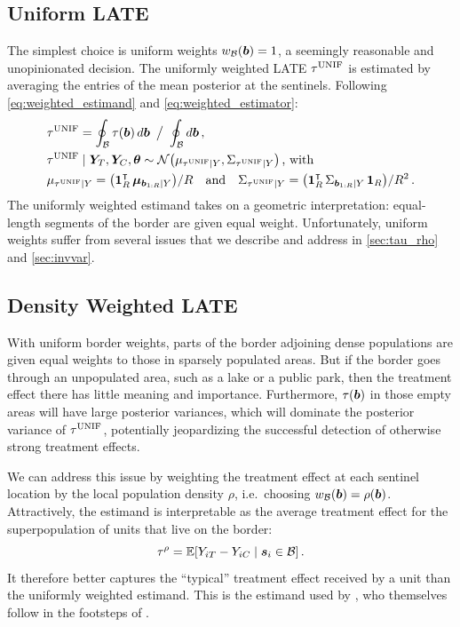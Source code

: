 \subsection{Uniform LATE}
The simplest choice is uniform weights \(w_{\mathcal{B}}(\bm{b})=1\), a seemingly reasonable and unopinionated decision.
The uniformly weighted LATE \(\tau^{\mathrm{UNIF}}\) is estimated by averaging the entries of the mean posterior at the sentinels.
Following \autoref{eq:weighted_estimand} and \autoref{eq:weighted_estimator}:
\begin{equation}\begin{split}
    &\unifavg = \oint_\border \tau(\sentinel) \dif\sentinel
        \ \big/ \ 
        \oint_\border \dif{\sentinel}  \,, \\
    &\unifavg \mid \yt, \yc, \hyperparam \sim \normal\del{\mu_{\unifavg \mid Y}, \Sigma_{\unifavg \mid Y}}\,\text{, with} \\
    &\mu_{\unifavg \mid Y} = \del{\ones_{\numsent}\trans \muvec_{\sentinels \mid Y}} / \numsent \quad\text{and}\quad
    \Sigma_{\unifavg \mid Y} = \del{\ones_{\numsent}\trans \Sigma_{\sentinels \mid Y} \ones_{\numsent}} / \numsent^2 \,.
\end{split}
\label{eq:unifavg}
\end{equation}
The uniformly weighted estimand takes on a geometric interpretation: equal-length segments of the border are given equal weight.
Unfortunately, uniform weights suffer from several issues that we describe and address in \autoref{sec:tau_rho} and \autoref{sec:invvar}.

\subsection{Density Weighted LATE}
\label{sec:tau_rho}

With uniform border weights, parts of the border adjoining dense populations are given equal weights to those in sparsely populated areas.
But if the border goes through an unpopulated area, such as a lake or a public park, then the treatment effect there has little meaning and importance.
Furthermore, \(\tau(\bm{b})\) in those empty areas will have large posterior variances, which will dominate the posterior variance of \(\tau^{\mathrm{UNIF}}\), potentially jeopardizing the successful detection of otherwise strong treatment effects.

We can address this issue by weighting the treatment effect at each sentinel location by the local population density \(\rho\),
i.e.\ choosing \(w_{\mathcal{B}}(\bm{b}) = \rho(\bm{b})\).
Attractively, the estimand is interpretable as the average treatment effect for the superpopulation of units that live on the border:
\begin{equation}
    \taurho = \E\sbr{Y_{i\treat} - Y_{i\ctrol} \mid \svec_i \in \border}\,.
\end{equation}
It therefore better captures the ``typical'' treatment effect received by a unit than the uniformly weighted estimand.
This is the estimand used by \cite{keele_titiunik_2015}, who themselves follow in the footsteps of \cite{imbens2011regression}.

